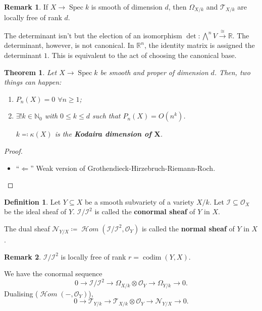\documentclass[12pt]{article}
\DeclareMathOperator{\Spec}{Spec}
\DeclareMathOperator{\shHom}{\mathcal H\textit{om}}
\DeclareMathOperator{\codim}{codim}
\newtheorem*{theorem}{Theorem}
\theoremstyle{definition}
\newtheorem*{definition}{Definition}
\newtheorem*{remark}{Remark}
\begin{document}
\begin{remark}
If $X\rightarrow\Spec k$ is smooth of dimension $d$, then $\Omega_{X/k}$ and $\mathcal T_{X/k}$ are locally free of rank $d$.
\end{remark}

The determinant isn't but the election of an isomorphism $\det:{\bigwedge}^nV\xrightarrow\cong\mathbb R$. The determinant, however, is not canonical. In $\mathbb R^n$, the identity matrix is assigned the determinant $1$. This is equivalent to the act of choosing the canonical base.

\begin{theorem}
Let $X\rightarrow\Spec k$ be smooth and proper of dimension $d$. Then, two things can happen:
\begin{enumerate}[label=\arabic*)]
\item $P_n(X)=0$ $\forall n\geq1$;
\item $\exists!k\in\mathbb N_0$ with $0\leq k\leq d$ such that $P_n(X)=O(n^k)$.

$k\eqqcolon\kappa(X)$ is the \textbf{Kodaira dimension of $\boldsymbol X$}.
\end{enumerate}
\end{theorem}

\begin{proof}
\begin{itemize}
\item ``$\Leftarrow$'' Weak version of Grothendieck-Hirzebruch-Riemann-Roch.
\end{itemize}
\end{proof}

\begin{definition}
Let $Y\subseteq X$ be a smooth subvariety of a variety $X/k$. Let $\mathcal I\subseteq\mathcal O_X$ be the ideal sheaf of $Y$. $\mathcal I/\mathcal I^2$ is called the \textbf{conormal sheaf} of $Y$ in $X$.

The dual sheaf $\mathcal N_{Y/X}\coloneqq\shHom(\mathcal I/\mathcal I^2,\mathcal O_Y)$ is called the \textbf{normal sheaf} of $Y$ in $X$.
\end{definition}

\begin{remark}
$\mathcal I/\mathcal I^2$ is locally free of rank $r=\codim(Y,X)$.
\end{remark}

We have the conormal sequence
\[0\longrightarrow\mathcal I/\mathcal I^2\longrightarrow\Omega_{X/k}\otimes\mathcal O_Y\longrightarrow\Omega_{Y/k}\longrightarrow0.\]
Dualising ($\shHom(-,\mathcal O_Y)$),
\[0\longrightarrow\mathcal T_{Y/k}\longrightarrow\mathcal T_{X/k}\otimes\mathcal O_Y\longrightarrow\mathcal N_{Y/X}\longrightarrow0.\]
\end{document}
